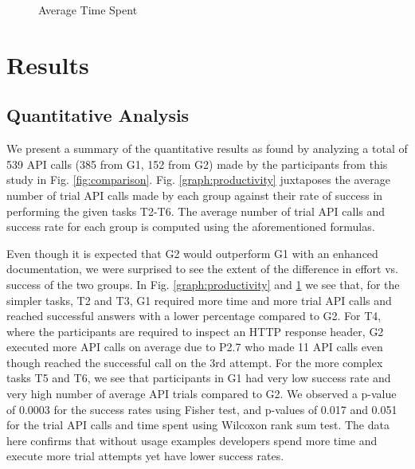 \begin{figure*}[!h]
\begin{subfigure}[b]{\textwidth}
\begin{tikzpicture}
\end{tikzpicture}
\caption{Average Time Spent}
\label{graph:time}
\end{subfigure}


\caption{Quantitative Comparison between G1 and G2}
\label{fig:comparison}
\end{figure*}


\section{Results}
\label{sec:results}


\subsection{Quantitative Analysis} %


We present a summary of the quantitative results as found by analyzing a total of 539 API calls (385 from G1, 152 from G2) made by the participants from this study in Fig. \ref{fig:comparison}. Fig. \ref{graph:productivity} juxtaposes the average number of trial API calls made by each group against their rate of success in performing the given tasks T2-T6. The average number of trial API calls and success rate for each group is computed using the aforementioned formulas.

Even though it is expected that G2 would outperform G1 with an enhanced documentation, we were surprised to see the extent of the difference in effort vs. success of the two groups. In Fig. \ref{graph:productivity} and \ref{graph:time} we see that, for the simpler tasks, T2 and T3, G1 required more time and more trial API calls and reached successful answers with a lower percentage compared to G2. For T4, where the participants are required to inspect an HTTP response header, G2 executed more API calls on average due to P2.7 who made 11 API calls even though reached the successful call on the 3rd attempt. For the more complex tasks T5 and T6, we see that participants in G1 had very low success rate and very high number of average API trials compared to G2. We observed a p-value of 0.0003 for the success rates using Fisher test, and p-values of 0.017  and 0.051 for the trial API calls and time spent using Wilcoxon rank sum test. The data here confirms that without usage examples developers spend more time and execute more trial attempts yet have lower success rates.

